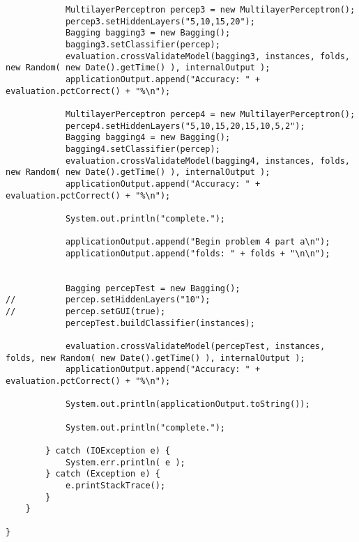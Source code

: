\begin{lstlisting}
			MultilayerPerceptron percep3 = new MultilayerPerceptron();
			percep3.setHiddenLayers("5,10,15,20");
			Bagging bagging3 = new Bagging();
			bagging3.setClassifier(percep);
			evaluation.crossValidateModel(bagging3, instances, folds, new Random( new Date().getTime() ), internalOutput );
			applicationOutput.append("Accuracy: " + evaluation.pctCorrect() + "%\n");

			MultilayerPerceptron percep4 = new MultilayerPerceptron();
			percep4.setHiddenLayers("5,10,15,20,15,10,5,2");
			Bagging bagging4 = new Bagging();
			bagging4.setClassifier(percep);
			evaluation.crossValidateModel(bagging4, instances, folds, new Random( new Date().getTime() ), internalOutput );
			applicationOutput.append("Accuracy: " + evaluation.pctCorrect() + "%\n");
			
			System.out.println("complete.");

			applicationOutput.append("Begin problem 4 part a\n");
			applicationOutput.append("folds: " + folds + "\n\n");

				
			Bagging percepTest = new Bagging();
//			percep.setHiddenLayers("10");
//			percep.setGUI(true);
			percepTest.buildClassifier(instances);
			
			evaluation.crossValidateModel(percepTest, instances, folds, new Random( new Date().getTime() ), internalOutput );
			applicationOutput.append("Accuracy: " + evaluation.pctCorrect() + "%\n");
			
			System.out.println(applicationOutput.toString());
			
			System.out.println("complete.");

		} catch (IOException e) {
			System.err.println( e );
		} catch (Exception e) {
			e.printStackTrace();
		}
	}

}
\end{lstlisting}


